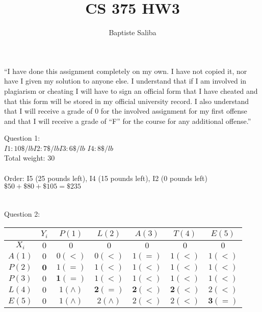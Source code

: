 \documentclass[12pt]{article}
\title{CS 375 HW3}
\author{Baptiste Saliba}
\newcommand\tab[1][1cm]{\hspace*{#1}}
\begin{document}
\large
\maketitle
“I have done this assignment completely on my own. I have not copied it, nor have I given my solution to anyone else. I understand that if I am involved in plagiarism or cheating I will have to sign an official form that I have cheated and that this form will be stored in my official university record. I also understand that I will receive a grade of 0 for the involved assignment for my first offense and that I will receive a grade of “F” for the course for any additional offense.”\\
\vspace{20mm}
\vfill

Question 1: \\
\tab\tab $I1:10\$/lb$\tab$ I2: 7\$/lb $\tab $I3:6\$/lb$ \tab $I4: 8\$/lb$\\
\tab\tab Total weight: 30\\\\
\tab Order: I5 (25 pounds left), I4 (15 pounds left), I2 (0 pounds left)\\
\tab $\$50 + \$80 + \$105 = \$235$\\\\\\

Question 2:\\
\begin{center}
\begin{tabular}{|c|c|c|c|c|c|c|}
\hline
 $ $ & $Y_i$ & $P(1)$ & $L(2)$ & $A(3)$ & $T(4)$ & $E(5)$\\
\hline
$X_i$ & $0$ & $0$ & $0$ &$0$&$0$&$0$\\
\hline
$A(1)$ & $0$ & $0(<)$ & $0(<)$ & $1(=)$ & $1(<)$ & $1(<)$\\
\hline
$P(2)$ & $\bm{0}$ & $1(=)$ & $1(<)$ & $1(<)$ & $1(<)$ & $1(<)$\\
\hline
$P(3)$ & $0$ & $\bm{1(=)}$ & $1(<)$ & $1(<)$ & $1(<)$ & $1(<)$\\
\hline
$L(4)$ & $0$ & $1(\wedge)$ & $\bm{2(=)}$ & $\bm{2(<)}$ & $\bm{2(<)}$ & $2(<)$\\
\hline
$E(5)$ & $0$ & $1(\wedge)$ & $2(\wedge)$ & $2(<)$ & $2(<)$ & $\bm{3(=)}$\\
\hline
\end{tabular}
\end{center}
\end{document}
